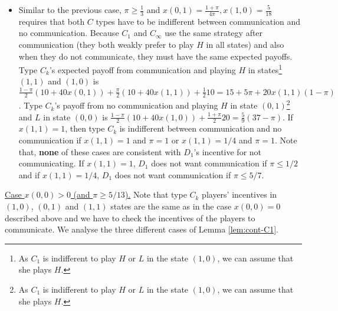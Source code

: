 \documentclass[12pt]{article}
\theoremstyle{definition}
\theoremstyle{remark}
\begin{document}
\begin{itemize}
\item Similar to the previous case, $\pi\geq \frac{1}{3}$ and $x(0,1)=\frac{1+\pi}{4\pi}, x(1,0)=\frac{5}{18}$ requires that both $C$ types have to be indifferent between communication and no communication. Because $C_1$ and $C_\infty$ use the same strategy after communication (they both weakly prefer to play $H$ in all states) and also when they do not communicate, they must have the same expected payoffs. Type $C_k$'s expected payoff from communication and playing $H$ in states\footnote{As $C_1$ is indifferent to play $H$ or $L$ in the state $(1,0)$, we can assume that she plays $H$.} $(1,1)$ and $(1,0)$ is $\frac{1-\pi}{2}(10+40x(0,1)) + \frac{\pi}{2}(10+40x(1,1))+\frac{1}{2}10= 15+5\pi+20x(1,1) (1-\pi)$. Type $C_k$'s payoff from no communication and playing $H$ in state $(0,1)$\footnote{As $C_1$ is indifferent to play $H$ or $L$ in the state $(1,0)$, we can assume that she plays $H$.} and $L$ in state $(0,0)$ is $\frac{1-\pi}{2} (10+40x(1,0)) + \frac{1+\pi}{2} 20 = \frac{5}{9}(37-\pi)$. If $x(1,1)=1$, then type $C_k$ is indifferent between communication and no communication if $x(1,1)=1$ and $\pi = 1$ or $x(1,1)=1/4$ and $\pi=1$. Note that, \textbf{none} of these cases are consistent with $D_1$'s incentive for not communicating. If $x(1,1)=1$, $D_1$ does not want communication if $\pi\leq 1/2$ and if $x(1,1)=1/4$, $D_1$ does not want communication if $\pi\leq 5/7$.
\end{itemize}

\underline{Case $x(0,0)>0$ (and $\pi\geq 5/13$).} Note that type $C_k$ players' incentives in $(1,0)$, $(0,1)$ and $(1,1)$ states are the same as in the case $x(0,0)=0$ described above and we have to check the incentives of the players to communicate. We analyse the three different cases of Lemma \ref{lem:cont-C1}. 
\end{document}
